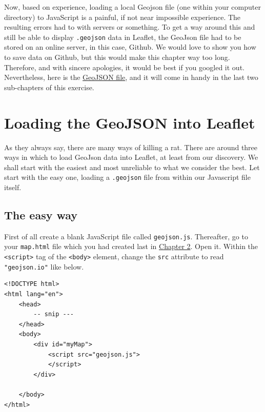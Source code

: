 \documentclass[
]{book}
\begin{document}
Now, based on experience, loading a local Geojson file (one within your computer directory) to JavaScript is a painful, if not near impossible experience. The resulting errors had to with servers or something. To get a way around this and still be able to display \texttt{.geojson} data in Leaflet, the GeoJson file had to be stored on an online server, in this case, Github. We would love to show you how to save data on Github, but this would make this chapter way too long. Therefore, and with sincere apologies, it would be best if you googled it out. Nevertheless, here is the \href{https://raw.githubusercontent.com/sammigachuhi/geojson_files/main/cities-geojson.geojson}{GeoJSON file}, and it will come in handy in the last two sub-chapters of this exercise.

\hypertarget{loading-the-geojson-into-leaflet}{%
\section{Loading the GeoJSON into Leaflet}\label{loading-the-geojson-into-leaflet}}

As they always say, there are many ways of killing a rat. There are around three ways in which to load GeoJson data into Leaflet, at least from our discovery. We shall start with the easiest and most unreliable to what we consider the best. Let start with the easy one, loading a \texttt{.geojson} file from within our Javascript file itself.

\hypertarget{the-easy-way}{%
\subsection{The easy way}\label{the-easy-way}}

First of all create a blank JavaScript file called \texttt{geojson.js}. Thereafter, go to your \texttt{map.html} file which you had created last in \protect\hyperlink{setting-the-superstructure}{Chapter 2}. Open it. Within the \texttt{\textless{}script\textgreater{}} tag of the \texttt{\textless{}body\textgreater{}} element, change the \texttt{src} attribute to read \texttt{"geojson.io"} like below.

\begin{verbatim}
<!DOCTYPE html>
<html lang="en">
    <head>
        -- snip ---
    </head>
    <body>
        <div id="myMap">
            <script src="geojson.js">
            </script> 
        </div>  
        
    </body>
</html>
\end{verbatim}
\end{document}
